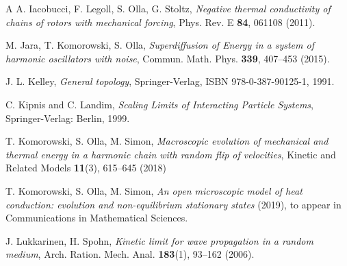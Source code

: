 \documentclass[EJP]{ejpecp} %
\numberwithin{equation}{section}
\begin{document}
\begin{thebibliography}{A}
 A. Iacobucci, F.  Legoll, S. Olla, G. Stoltz, \emph{Negative thermal conductivity of chains of rotors with mechanical forcing}, Phys. Rev. E \textbf{84}, 061108 (2011). 

  M. Jara, T. Komorowski, S. Olla, \emph{Superdiffusion
    of Energy in a system of harmonic oscillators with noise}, 
  Commun. Math. Phys. \textbf{339}, 407--453 (2015).


 J. L. Kelley, {\em General topology}, Springer-Verlag, ISBN 978-0-387-90125-1, 1991.


 C. Kipnis and C. Landim,
{\it Scaling Limits of Interacting Particle Systems},
Springer-Verlag: Berlin, 1999.

 T. Komorowski, S. Olla, M. Simon, \emph{ Macroscopic evolution of mechanical and thermal energy in a harmonic chain with random flip of velocities}, Kinetic and Related Models \textbf{11}(3), 615--645 (2018)

  T. Komorowski, S. Olla, M. Simon, \emph{An open microscopic model of heat conduction: evolution and non-equilibrium stationary states} (2019), to appear in Communications in Mathematical Sciences.


%
%

 J. Lukkarinen, H. Spohn, \emph{Kinetic limit for wave propagation in a random medium}, Arch. Ration. Mech. Anal. \textbf{183}(1), 93--162 (2006).


%
%
%
%


\end{thebibliography}
\end{document}

